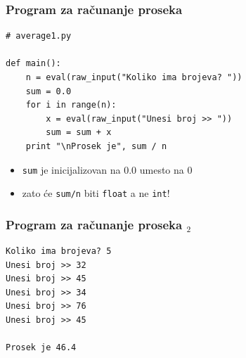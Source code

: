 \documentclass[utf8,compress]{beamer}
\begin{document}


\begin{frame}[fragile]
  \frametitle{Program za računanje proseka}
\begin{verbatim}
# average1.py

def main():
    n = eval(raw_input("Koliko ima brojeva? "))
    sum = 0.0
    for i in range(n):
        x = eval(raw_input("Unesi broj >> "))
        sum = sum + x
    print "\nProsek je", sum / n
\end{verbatim}
  \begin{itemize}
    \item \texttt{sum} je inicijalizovan na 0.0 umesto na 0
    \item zato će \texttt{sum/n} biti \texttt{float} a ne \texttt{int}!
  \end{itemize}
\end{frame}

\begin{frame}[fragile]
  \frametitle{Program za računanje proseka $_2$}
\begin{verbatim}
Koliko ima brojeva? 5
Unesi broj >> 32
Unesi broj >> 45
Unesi broj >> 34
Unesi broj >> 76
Unesi broj >> 45

Prosek je 46.4
\end{verbatim}
\end{frame}
\end{document}
